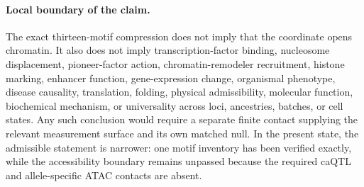 \paragraph{Local boundary of the claim.}
The exact thirteen-motif compression does not imply that the coordinate opens chromatin.  It also does not imply transcription-factor binding, nucleosome displacement, pioneer-factor action, chromatin-remodeler recruitment, histone marking, enhancer function, gene-expression change, organismal phenotype, disease causality, translation, folding, physical admissibility, molecular function, biochemical mechanism, or universality across loci, ancestries, batches, or cell states.  Any such conclusion would require a separate finite contact supplying the relevant measurement surface and its own matched null.  In the present state, the admissible statement is narrower: one motif inventory has been verified exactly, while the accessibility boundary remains unpassed because the required caQTL and allele-specific ATAC contacts are absent.
